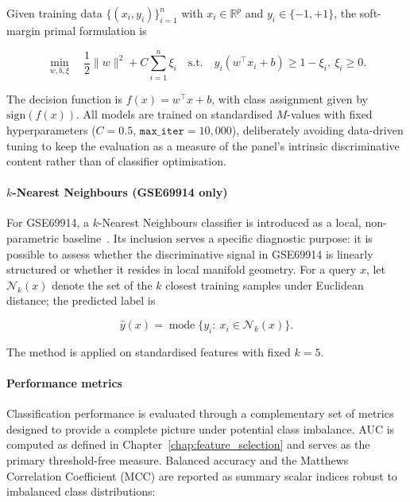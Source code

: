 Given training data $\{(x_i, y_i)\}_{i=1}^n$ with
$x_i \in \mathbb{R}^p$ and $y_i \in \{-1,+1\}$, the soft-margin
primal formulation is

\begin{equation}
\min_{w,b,\xi} \quad
\frac{1}{2}\lVert w\rVert^2 + C \sum_{i=1}^n \xi_i
\quad\text{s.t.}\quad
y_i(w^\top x_i + b) \ge 1 - \xi_i,\ \xi_i \ge 0.
\end{equation}

The decision function is $f(x) = w^\top x + b$, with class
assignment given by $\mathrm{sign}(f(x))$. All models are
trained on standardised $M$-values with fixed hyperparameters
($C = 0.5$, $\texttt{max\_iter} = 10{,}000$), deliberately
avoiding data-driven tuning to keep the evaluation as a
measure of the panel's intrinsic discriminative content rather
than of classifier optimisation.

\paragraph{$k$-Nearest Neighbours (GSE69914 only)}

For GSE69914, a $k$-Nearest Neighbours classifier is
introduced as a local,
non-parametric baseline~\cite{cover1967nn}. Its inclusion
serves a specific diagnostic purpose: it is possible to assess whether the discriminative
signal in GSE69914 is linearly structured or whether it
resides in local manifold geometry. For a query $x$, let
$\mathcal{N}_k(x)$ denote the set of the $k$ closest training
samples under Euclidean distance; the predicted label is

\begin{equation}
\hat{y}(x) = \operatorname{mode}\{y_i :\ x_i \in \mathcal{N}_k(x)\}.
\end{equation}

The method is applied on standardised features with fixed $k = 5$.

\paragraph{Performance metrics}

Classification performance is evaluated through a
complementary set of metrics designed to provide a complete
picture under potential class imbalance. AUC is computed as
defined in Chapter~\ref{chap:feature_selection} and serves as
the primary threshold-free measure. Balanced accuracy and the
Matthews Correlation Coefficient (MCC) are reported as
summary scalar indices robust to imbalanced class distributions:

